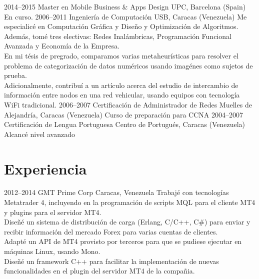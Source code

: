 \documentclass[]{friggeri-cv} %
\begin{document}
\begin{entrylist}
\entry
{2014--2015}
{Master {\normalfont en Mobile Business \& Apps Design}}
{UPC, Barcelona (Spain)}
{En curso.}
\entry
{2006--2011}
{Ingeniería {\normalfont de Computación}}
{USB, Caracas (Venezuela)}
{Me especialicé en Computación Gráfica y Diseño y Optimización de Algoritmos.
Además, tomé tres electivas: Redes Inalámbricas, Programación Funcional Avanzada
y Economía de la Empresa.
\\
En mi tésis de pregrado, comparamos varias metaheurísticas para resolver el
problema de categorización de datos numéricos usando imagénes como sujetos de
prueba.
\\
Adicionalmente, contribuí a un artículo acerca del estudio de intercambio de
información entre nodos en una red vehicular, usando equipos con tecnología WiFi
tradicional.}
\entry
{2006--2007}
{Certificación de Administrador de Redes}
{Muelles de Alejandría, Caracas (Venezuela)}
{Curso de preparación para CCNA}
\entry
{2004--2007}
{Certificación de Lengua Portuguesa}
{Centro de Portugués, Caracas (Venezuela)}
{Alcancé nivel avanzado}
\end{entrylist}


\section{Experiencia}

\begin{entrylist}
\entry
{2012--2014}
{GMT Prime Corp}
{Caracas, Venezuela}
{Trabajé con tecnologías Metatrader 4, incluyendo en la programación de scripts
MQL para el cliente MT4 y plugins para el servidor MT4.
\\
Diseñé un sistema de distribución de carga (Erlang, C/C++, C\#) para enviar y
recibir información del mercado Forex para varias cuentas de clientes.
\\
Adapté un API de MT4 provisto por terceros para que se pudiese ejecutar en
máquinas Linux, usando Mono.
\\   
Diseñé un framework C++ para facilitar la implementación de nuevas
funcionalidades en el plugin del servidor MT4 de la compañia.}
\end{entrylist}
\end{document}
